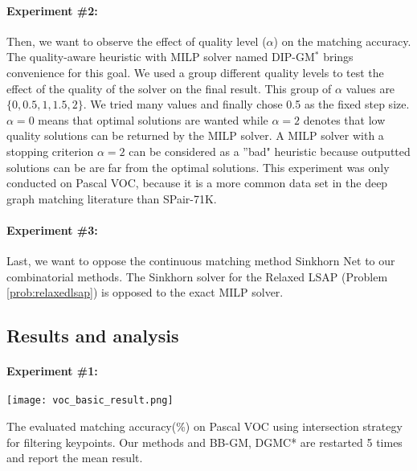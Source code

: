 \documentclass[times,onecolumn,final,authoryear]{article}
\theoremstyle{definition}
\begin{document}
\paragraph{Experiment \#2: }  Then, we want to observe the effect of quality level ($\alpha$) on the matching accuracy. The quality-aware heuristic with MILP solver named DIP-GM$^*$ brings convenience for this goal. We used a group different quality levels to test the effect of the quality of the solver on the final result. This group of $\alpha$ values are $\{0, 0.5, 1, 1.5, 2\}$. We tried many values and finally chose 0.5 as the fixed step size. $\alpha=0$ means that optimal solutions are wanted while $\alpha=2$ denotes that low quality solutions can be returned by the MILP solver. A MILP solver with a stopping criterion $\alpha=2$ can be considered as a ''bad" heuristic because outputted solutions can be are far from the optimal solutions. This experiment was only conducted on Pascal VOC, because it is a more common data set in the deep graph matching literature than SPair-71K. %

\paragraph{Experiment \#3: } Last, we want to oppose the continuous matching method Sinkhorn Net \cite{SinkhornNet} to our combinatorial methods. The Sinkhorn solver \cite{SinkhornAlgo} for the Relaxed LSAP (Problem \ref{prob:relaxedlsap}) is opposed to the exact MILP solver. %

\subsection{Results and analysis}
\paragraph{Experiment \#1: }
\begin{table}[htbp]
    \centering
    \texttt{[image: voc\_basic\_result.png]}
    \caption{The evaluated matching accuracy(\%) on Pascal VOC using intersection strategy for filtering keypoints. Our methods and BB-GM\cite{BB-GM}, DGMC*\cite{DGMC} are restarted 5 times and report the mean result.}
    \label{t1}
\end{table}
\end{document}
